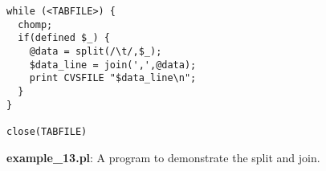 \documentclass[17pt,dvips]{foils}
\begin{document}



\begin{verbatim}
while (<TABFILE>) {
  chomp;
  if(defined $_) {
    @data = split(/\t/,$_);
    $data_line = join(',',@data);
    print CVSFILE "$data_line\n";
  }
}

close(TABFILE)
\end{verbatim}
{\bf example\_13.pl}: A program to demonstrate the split and join.
\end{document}
